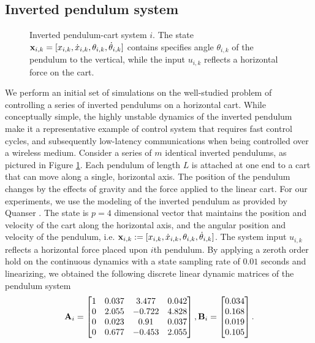 \subsection{Inverted pendulum system}

\begin{figure}

\caption{Inverted pendulum-cart system $i$. The state ${\mathbf x}_{i,k} = [x_{i,k}, \dot{x}_{i,k}, \theta_{i,k}, \dot{\theta}_{i,k}]$ contains specifies angle $ \theta_{i,k}$ of the pendulum to the vertical, while the input $u_{i,k}$ reflects a horizontal force on the cart.}
\label{fig_inverted_pendulum}
\end{figure}


We perform an initial set of simulations on the well-studied problem of controlling a series of inverted pendulums on a horizontal cart. While conceptually simple, the highly unstable dynamics of the inverted pendulum make it a representative example of control system that requires fast control cycles, and subsequently low-latency communications when being controlled over a wireless medium. Consider a series of $m$ identical inverted pendulums, as pictured in Figure \ref{fig_inverted_pendulum}. Each pendulum of length $L$ is attached at one end to a cart that can move along a single, horizontal axis. The position of the pendulum changes by the effects of gravity and the force applied to the linear cart. For our experiments, we use the modeling of the inverted pendulum as provided by Quanser \cite{quanser}. The state is $p=4$ dimensional vector that maintains the position and velocity of the cart along the horizontal axis, and the angular position and velocity of the pendulum, i.e. ${\mathbf x}_{i,k} := [x_{i,k}, \dot{x}_{i,k}, \theta_{i,k}, \dot{\theta}_{i,k}]$. The system input $u_{i,k}$ reflects a horizontal force placed upon $i$th pendulum. By applying a zeroth order hold on the continuous dynamics with a state sampling rate of $0.01$ seconds and linearizing, we obtained the following discrete linear dynamic matrices of the pendulum system
%
\begin{align}\label{eq_control_orig}
\bbA_i =
\begin{bmatrix}
1 & 0.037 & 3.477 & 0.042 \\
0 & 2.055 & -0.722 & 4.828 \\
0 & 0.023 & 0.91 & 0.037 \\
0 & 0.677 & -0.453 & 2.055
\end{bmatrix},
\bbB_i =
\begin{bmatrix}
0.034 \\ 0.168 \\ 0.019 \\ 0.105
\end{bmatrix}.
\end{align}
%

